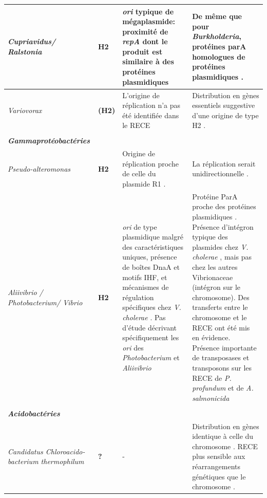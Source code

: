 \begin{longtable}{@{\hspace{-2cm}} >{\footnotesize\itshape}p{} | >{\bfseries\scriptsize}p{} | >{\scriptsize}p{} | >{\scriptsize}p{} @{\hspace{0.5cm}}}
	Cupriavidus/ Ralstonia & H2 & \textit{ori} typique de mégaplasmide: proximité de \textit{repA} dont le produit est similaire à des protéines plasmidiques \citep{MacLellan2004,salanoubat2002genome} & De même que pour \textit{Burkholderia}, protéines parA homologues de protéines plasmidiques \citep{MacLellan2004,Passot2012}. \\
	\hline
	Variovorax & (H2)& L'origine de réplication n'a pas été identifiée dans le RECE \citep{han2011complete}& Distribution en gènes essentiels suggestive d'une origine de type H2 \citep{han2011complete}. \\
	\hline
	\multicolumn{1}{@{\hspace{-2cm}}} {} \\
	\multicolumn{4}{@{\hspace{-2cm}} p{\textwidth}} {\textbf{Gammaprotéobactéries}}\\
	Pseudo-alteromonas & H2 & Origine de réplication proche de celle du plasmide R1 \citep{medigue2005coping}. & La réplication serait unidirectionnelle \citep{medigue2005coping}.\\
	\hline
	Aliivibrio / Photobacterium/ Vibrio & H2 & \textit{ori} de type plasmidique malgré des caractéristiques uniques, présence de boîtes DnaA et motifs IHF, et mécanismes de régulation spécifiques chez \textit{V. cholerae} \citep{MacLellan2004}. Pas d'étude décrivant spécifiquement les \textit{ori} des \textit{Photobacterium} et \textit{Aliivibrio} & Protéine ParA proche des protéines plasmidiques \citep{Thompson2004}. Présence d'intégron typique des plasmides chez \textit{V. cholerae} \citep{Heidelberg2000}, mais pas chez les autres Vibrionaceae (intégron sur le chromosome). Des transferts entre le chromosome et le RECE ont été mis en évidence. Présence importante de transposases et transposons sur les RECE de \textit{P. profundum} et de \textit{A. salmonicida}  \citep{MacLellan2004,Kirkup2010,egan2003distinct,chen2003comparative} \\
     \hline
	\multicolumn{1}{@{\hspace{-2cm}}} {} \\
     \multicolumn{1}{@{\hspace{-2cm}} p{0.15\textwidth}} {\textbf{Acidobactéries}}\\
     Candidatus \textnormal{Chloroacido-bacterium thermophilum} & ? & \centering - & Distribution en gènes identique à celle du chromosome  \citep{GarciaCostas2012}. RECE plus sensible aux réarrangements génétiques que le chromosome \citep{GarciaCostas2012}. \\

\end{longtable}

